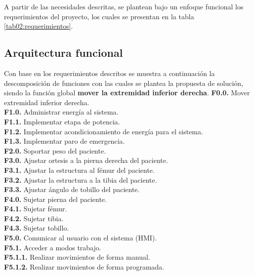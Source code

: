 A partir de las necesidades descritas, se plantean bajo un enfoque funcional los requerimientos del proyecto, los cuales se presentan en la tabla \ref{tab02:requerimientos}.

\subsection{Arquitectura funcional}
Con base en los requerimientos descritos se muestra a continuación la descomposición de funciones con las cuales se plantea la propuesta de solución, siendo la función global \textbf{mover la extremidad inferior derecha}.
\clearpage
{} \textbf{F0.0.} Mover extremidad inferior derecha.\\
 \textbf{F1.0.} Administrar energía al sistema.\\
 \textbf{F1.1.} Implementar etapa de potencia.\\
 \textbf{F1.2.} Implementar acondicionamiento de energía para el sistema.\\
 \textbf{F1.3.} Implementar paro de emergencia.\\
 \textbf{F2.0.} Soportar peso del paciente.\\
 \textbf{F3.0.} Ajustar ortesis a la pierna derecha del paciente.\\
 \textbf{F3.1.} Ajustar la estructura al fémur del paciente.\\
 \textbf{F3.2.} Ajustar la estructura a la tibia del paciente.\\
 \textbf{F3.3.} Ajustar ángulo de tobillo del paciente.\\
 \textbf{F4.0.} Sujetar pierna del paciente.\\
 \textbf{F4.1.} Sujetar fémur.\\
 \textbf{F4.2.} Sujetar tibia.\\
 \textbf{F4.3.} Sujetar tobillo.\\
 \textbf{F5.0.} Comunicar al usuario con el sistema (HMI).\\
 \textbf{F5.1.} Acceder a modos trabajo.\\
 \textbf{F5.1.1.} Realizar movimientos de forma manual.\\
 \textbf{F5.1.2.} Realizar movimientos de forma programada.\\

